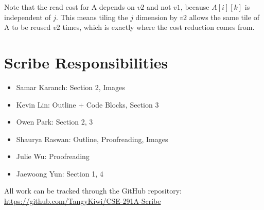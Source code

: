 \documentclass[twoside]{article}
\begin{document}
Note that the read cost for A depends on $v2$ and not $v1$, because $A[i][k]$ is independent of $j$. This means tiling the $j$ dimension by $v2$ allows the same tile of A to be reused $v2$ times, which is exactly where the cost reduction comes from.

\section*{Scribe Responsibilities}
\begin{itemize}
    \item{Samar Karanch}: Section 2, Images
    \item{Kevin Lin}: Outline + Code Blocks, Section 3 
    \item{Owen Park}: Section 2, 3
    \item{Shaurya Raswan}: Outline, Proofreading, Images
    \item{Julie Wu}: Proofreading
    \item{Jaewoong Yun}: Section 1, 4
\end{itemize}
All work can be tracked through the GitHub repository: \href{https://github.com/TangyKiwi/CSE-291A-Scribe}{https://github.com/TangyKiwi/CSE-291A-Scribe}
\end{document}
